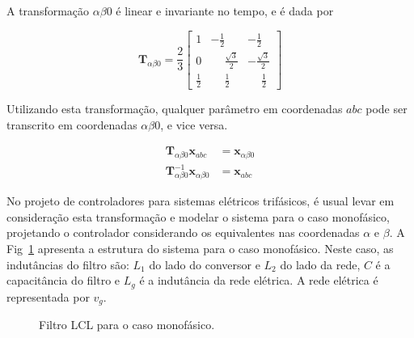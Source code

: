     A transformação $\alpha \beta 0$ é linear e invariante no tempo, e é dada por

    \begin{equation}
        \mathbf{T}_{\alpha \beta 0} = \frac{2}{3} \left[
        \begin{array}{ccc}
            1 & -\frac{1}{2} & -\frac{1}{2} \\[0.3em]
            0 & \phantom{-}\frac{\sqrt{3}}{2} & -\frac{\sqrt{3}}{2} \\[0.3em]
            \frac{1}{2} &  \phantom{-}\frac{1}{2} & \phantom{-}\frac{1}{2}
        \end{array}
        \right]
        \label{eq:alpha_beta_0}
    \end{equation}

    Utilizando esta transformação, qualquer parâmetro em coordenadas $abc$ pode ser
    transcrito em coordenadas $\alpha \beta 0$, e vice versa.

    \begin{equation*}
        \begin{split}
            \mathbf{T}_{\alpha \beta 0} \mathbf{x}_{abc} & = \mathbf{x}_{\alpha \beta 0} \\
            \mathbf{T}_{\alpha \beta 0}^{-1} \mathbf{x}_{\alpha \beta 0} & = \mathbf{x}_{abc}
        \end{split}
    \end{equation*}

    No projeto de controladores para sistemas elétricos trifásicos, é usual levar em
    consideração esta transformação e modelar o sistema para o caso monofásico, projetando
    o controlador considerando os equivalentes nas coordenadas $\alpha$ e $\beta$. A
    Fig~\ref{fig:LCL_geral} apresenta a estrutura do sistema para o caso monofásico. Neste
    caso, as indutâncias do filtro são: $L_1$ do lado do conversor e $L_2$ do lado da rede,
    $C$ é a capacitância do filtro e $L_g$ é a indutância da rede elétrica. A rede elétrica
    é representada por $v_g$.

    \begin{figure}[htb]
        \centering{
            \def\svgwidth{\textwidth}
            }
        \renewcommand\figurename{Fig.}
        \caption{Filtro LCL para o caso monofásico.}
        \label{fig:LCL_geral}
    \end{figure}

